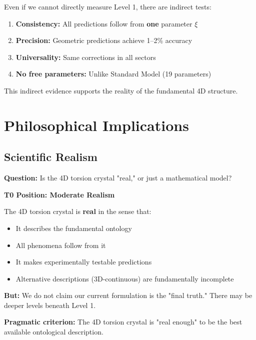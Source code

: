 	Even if we cannot directly measure Level 1, there are indirect tests:
	
	\begin{enumerate}
		\item \textbf{Consistency:} All predictions follow from \textbf{one} parameter $\xi$
		\item \textbf{Precision:} Geometric predictions achieve 1--2\% accuracy
		\item \textbf{Universality:} Same corrections in all sectors
		\item \textbf{No free parameters:} Unlike Standard Model (19 parameters)
	\end{enumerate}
	
	This indirect evidence supports the reality of the fundamental 4D structure.
	
	\section{Philosophical Implications}
	
	\subsection{Scientific Realism}
	
	\begin{philosophical}
		\textbf{Question:} Is the 4D torsion crystal "real," or just a mathematical model?
		
		\vspace{0.3cm}
		
		\textbf{T0 Position: Moderate Realism}
		
		The 4D torsion crystal is \textbf{real} in the sense that:
		\begin{itemize}
			\item It describes the fundamental ontology
			\item All phenomena follow from it
			\item It makes experimentally testable predictions
			\item Alternative descriptions (3D-continuous) are fundamentally incomplete
		\end{itemize}
		
		\vspace{0.3cm}
		
		\textbf{But:}
		We do not claim our current formulation is the "final truth." There may be deeper levels beneath Level 1.
		
		\vspace{0.3cm}
		
		\textbf{Pragmatic criterion:}
		The 4D torsion crystal is "real enough" to be the best available ontological description.
	\end{philosophical}
	
